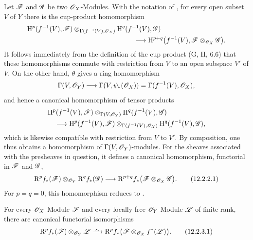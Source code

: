 \begin{env}[12.2.2]
\label{0.12.2.2}
Let $\mathscr{F}$ and $\mathscr{G}$ be two $\mathscr{O}_X$-Modules.
With the notation of , for every open subset $V$ of
$Y$ there is the cup-product homomorphism 
\[
  \begin{aligned}
  &\HH^p(f^{-1}(V),\sh{F})
    \otimes_{\Gamma(f^{-1}(V),\sh{O}_X)}
    \HH^q(f^{-1}(V),\sh{G})\\
  &\hspace{55mm}\longrightarrow
    \HH^{p+q}\bigl(f^{-1}(V),
      \sh{F}\otimes_{\sh{O}_X}\sh{G}\bigr).
  \end{aligned}
\]
It follows immediately from the definition of the cup product
(G, II, 6.6) that these homomorphisms commute with restriction from
$V$ to an open subspace $V'$ of $V$.
On the other hand, $\theta$ gives a ring homomorphism
\[
  \Gamma(V,\mathscr{O}_Y)
  \longrightarrow\Gamma(V,\psi_*(\mathscr{O}_X))
  =\Gamma(f^{-1}(V),\mathscr{O}_X),
\]
and hence a canonical homomorphism of tensor products
\[
  \begin{aligned}
  &\mathrm{H}^p(f^{-1}(V),\mathscr{F})
    \otimes_{\Gamma(V,\mathscr{O}_Y)}
    \mathrm{H}^q(f^{-1}(V),\mathscr{G})\\
  &\quad\longrightarrow
    \mathrm{H}^p(f^{-1}(V),\mathscr{F})
    \otimes_{\Gamma(f^{-1}(V),\mathscr{O}_X)}
    \mathrm{H}^q(f^{-1}(V),\mathscr{G}),
  \end{aligned}
\]
which is likewise compatible with restriction from $V$ to $V'$.
By composition, one thus obtains a homomorphism of
$\Gamma(V,\mathscr{O}_Y)$-modules.  For the sheaves associated with the
presheaves in question, it defines a canonical homomorphism,
functorial in $\mathscr{F}$ and $\mathscr{G}$,
\[
  \mathrm{R}^p f_*(\mathscr{F})\otimes_{\mathscr{O}_Y}\mathrm{R}^q f_*(\mathscr{G})
  \longrightarrow
  \mathrm{R}^{p+q}f_*
    \bigl(\mathscr{F}\otimes_{\mathscr{O}_X}\mathscr{G}\bigr).
  \tag{12.2.2.1}
  \label{0.12.2.2.1}
\]
For $p=q=0$, this homomorphism reduces to
.
\end{env}

\begin{proposition}[12.2.3]
\label{0.12.2.3}
For every $\mathscr{O}_X$-Module $\mathscr{F}$ and every locally free
$\mathscr{O}_Y$-Module $\mathscr{L}$ of finite rank, there are canonical
functorial isomorphisms
\[
  \RR^p f_*(\sh{F})\otimes_{\sh{O}_Y}\sh{L}
  \simto
  \RR^p f_*
    \bigl(\sh{F}\otimes_{\sh{O}_X}f^*(\sh{L})\bigr).
  \tag{12.2.3.1}
  \label{0.12.2.3.1}
\]
\end{proposition}

